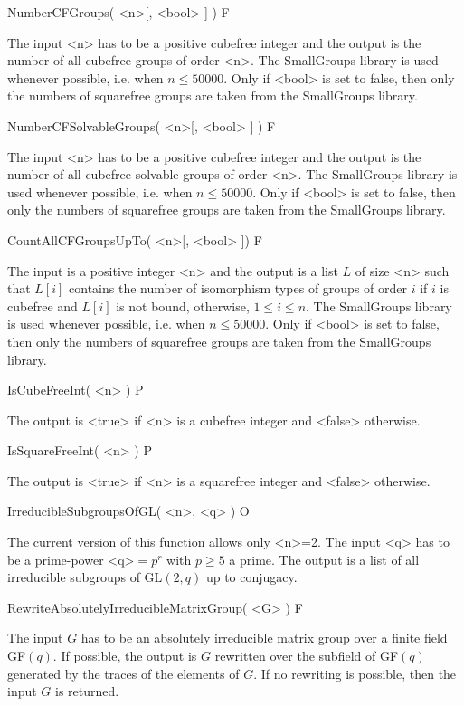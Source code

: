 \>NumberCFGroups( <n>[, <bool> ] ) F

The input <n> has to be a positive cubefree integer and the output is the number of all
cubefree groups of order <n>. The SmallGroups library  is used whenever
possible, i.e. when $n\leq 50000$. Only if <bool> is set to false, then only the numbers of
squarefree groups are taken from the SmallGroups library.


\>NumberCFSolvableGroups( <n>[, <bool> ] ) F 

The input <n> has to be a positive cubefree integer and the output is the number of all
cubefree solvable groups of order <n>. The SmallGroups library is used whenever
possible, i.e. when $n\leq 50000$. Only if <bool> is set to false, then only the numbers of
squarefree groups are taken from the SmallGroups library.


\>CountAllCFGroupsUpTo( <n>[, <bool> ]) F  

The input is a positive integer <n> and the output is a list $L$ of size <n> such that
$L[i]$ contains the number of isomorphism types of groups of order $i$ if $i$
is cubefree and $L[i]$ is not bound, otherwise, $1\leq i \leq n$. The SmallGroups library is used whenever
possible, i.e. when $n\leq 50000$. Only if <bool> is set to false, then only the numbers of
squarefree groups are taken from the SmallGroups library.


\>IsCubeFreeInt( <n> ) P

The output is <true> if <n> is a cubefree integer and <false> otherwise.


\>IsSquareFreeInt( <n> ) P

The output is <true> if <n> is a squarefree integer and <false> otherwise.

\>IrreducibleSubgroupsOfGL( <n>, <q> ) O

The current version of this function allows only <n>=2. The input <q> has to be a prime-power <q>$=p^r$ with $p\geq 5$ a prime. The output
is a list of all irreducible subgroups of GL$(2,q)$ up to conjugacy.

\>RewriteAbsolutelyIrreducibleMatrixGroup( <G> ) F

The input $G$ has to be an absolutely irreducible matrix group over a finite
field GF$(q)$. If possible, the output is
$G$ rewritten over the subfield of GF$(q)$ generated by the traces of the
elements of $G$. If no rewriting is possible, then the
input $G$ is returned. 



